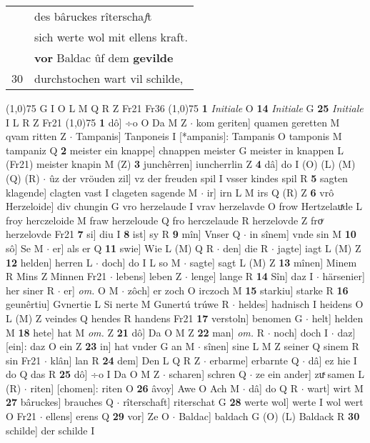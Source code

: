 \documentclass[8pt,a4paper,notitlepage]{article}
\begin{document}
\begin{table}[ht]
\begin{minipage}[t]{0.5\linewidth}
\begin{tabular}{rl}
 & des bâruckes rîterscha\textit{f}t\\ 
 & sich werte wol mit ellens kraft.\\ 
 & \textbf{vor} Baldac ûf dem \textbf{gevilde}\\ 
30 & durchstochen wart vil schilde,\\ 
\end{tabular}
\scriptsize
\line(1,0){75} \newline
G I O L M Q R Z Fr21 Fr36 \newline
\line(1,0){75} \newline
\textbf{1} \textit{Initiale} O  \textbf{14} \textit{Initiale} G  \textbf{25} \textit{Initiale} I L R Z Fr21  \newline
\line(1,0){75} \newline
\textbf{1} dô] ÷o O Da M Z  $\cdot$ kom geriten] quamen geretten M qvam ritten Z  $\cdot$ Tampanis] Tanponeis I [*ampanis]: Tampanis O tamponis M tampaniz Q \textbf{2} meister ein knappe] chnappen meister G meister in knappen L (Fr21) meister knapin M (Z) \textbf{3} junchêrren] iuncherrlin Z \textbf{4} dâ] do I (O) (L) (M) (Q) (R)  $\cdot$ ûz der vröuden zil] vz der freuden spil I vsser kindes spil R \textbf{5} sagten klagende] clagten vast I clageten sagende M  $\cdot$ ir] irn L M irs Q (R) Z \textbf{6} vrô Herzeloide] div chungin G vro herzelaude I vrav herzelavde O frow Hertzelauͯde L froy herczeloide M fraw herzeloude Q fro herczelaude R herzelovde Z froͮ herzelovde Fr21 \textbf{7} si] diu I \textbf{8} ist] sy R \textbf{9} mîn] Vnser Q  $\cdot$ in sînem] vnde sin M \textbf{10} sô] Se M  $\cdot$ er] als er Q \textbf{11} swie] Wie L (M) Q R  $\cdot$ den] die R  $\cdot$ jagte] iagt L (M) Z \textbf{12} helden] herren L  $\cdot$ doch] do I L so M  $\cdot$ sagte] sagt L (M) Z \textbf{13} mînen] Minem R Mins Z Minnen Fr21  $\cdot$ lebens] leben Z  $\cdot$ lenge] lange R \textbf{14} Sîn] daz I  $\cdot$ härsenier] her siner R  $\cdot$ er] \textit{om.} O M  $\cdot$ zôch] er zoch O irczoch M \textbf{15} starkiu] starke R \textbf{16} geunêrtiu] Gvnertie L Si nerte M Gunertú trúwe R  $\cdot$ heldes] hadnisch I heidens O L (M) Z veindes Q hendes R handens Fr21 \textbf{17} verstoln] benomen G  $\cdot$ helt] helden M \textbf{18} hete] hat M \textit{om.} Z \textbf{21} dô] Da O M Z \textbf{22} man] \textit{om.} R  $\cdot$ noch] doch I  $\cdot$ daz] [ein]: daz O ein Z \textbf{23} in] hat vnder G an M  $\cdot$ sînen] sine L M Z seiner Q sinem R sin Fr21  $\cdot$ klân] lan R \textbf{24} dem] Den L Q R Z  $\cdot$ erbarme] erbarnte Q  $\cdot$ dâ] ez hie I do Q das R \textbf{25} dô] ÷o I Da O M Z  $\cdot$ scharen] schren Q  $\cdot$ ze ein ander] zuͯ samen L (R)  $\cdot$ riten] [chomen]: riten O \textbf{26} âvoy] Awe O Ach M  $\cdot$ dâ] do Q R  $\cdot$ wart] wirt M \textbf{27} bâruckes] brauches Q  $\cdot$ rîterschaft] riterschat G \textbf{28} werte wol] werte I wol wert O Fr21  $\cdot$ ellens] erens Q \textbf{29} vor] Ze O  $\cdot$ Baldac] baldach G (O) (L) Baldack R \textbf{30} schilde] der schilde I \newline

\end{minipage}
\end{table}
\end{document}
